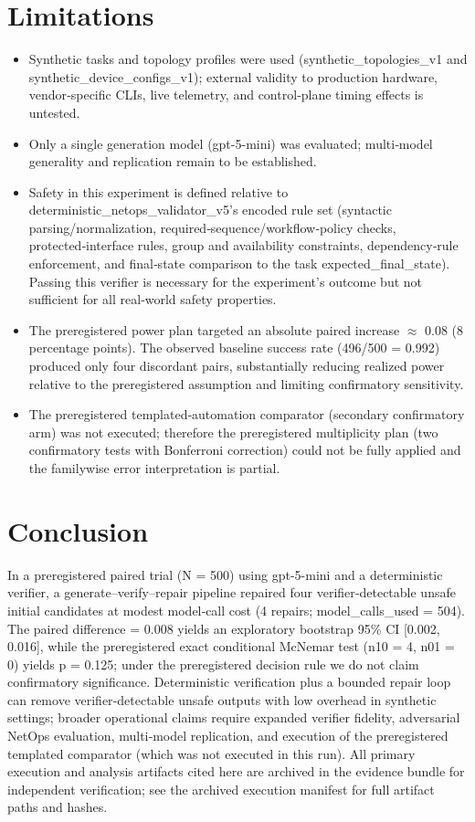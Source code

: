 \documentclass[conference]{IEEEtran}
\begin{document}
\section{Limitations}
\begin{itemize}
\item Synthetic tasks and topology profiles were used (synthetic\_topologies\_v1 and synthetic\_device\_configs\_v1); external validity to production hardware, vendor‑specific CLIs, live telemetry, and control‑plane timing effects is untested.
\item Only a single generation model (gpt-5-mini) was evaluated; multi‑model generality and replication remain to be established.
\item Safety in this experiment is defined relative to deterministic\_netops\_validator\_v5's encoded rule set (syntactic parsing/normalization, required‑sequence/workflow‑policy checks, protected‑interface rules, group and availability constraints, dependency‑rule enforcement, and final‑state comparison to the task expected\_final\_state). Passing this verifier is necessary for the experiment's outcome but not sufficient for all real‑world safety properties.
\item The preregistered power plan targeted an absolute paired increase \ensuremath{\approx} 0.08 (8 percentage points). The observed baseline success rate (496/500 = 0.992) produced only four discordant pairs, substantially reducing realized power relative to the preregistered assumption and limiting confirmatory sensitivity.
\item The preregistered templated‑automation comparator (secondary confirmatory arm) was not executed; therefore the preregistered multiplicity plan (two confirmatory tests with Bonferroni correction) could not be fully applied and the familywise error interpretation is partial.
\end{itemize}

\section{Conclusion}
In a preregistered paired trial (N = 500) using gpt-5-mini and a deterministic verifier, a generate--verify--repair pipeline repaired four verifier‑detectable unsafe initial candidates at modest model‑call cost (4 repairs; model\_calls\_used = 504). The paired difference = 0.008 yields an exploratory bootstrap 95\% CI [0.002, 0.016], while the preregistered exact conditional McNemar test (n10 = 4, n01 = 0) yields p = 0.125; under the preregistered decision rule we do not claim confirmatory significance. Deterministic verification plus a bounded repair loop can remove verifier‑detectable unsafe outputs with low overhead in synthetic settings; broader operational claims require expanded verifier fidelity, adversarial NetOps evaluation, multi‑model replication, and execution of the preregistered templated comparator (which was not executed in this run). All primary execution and analysis artifacts cited here are archived in the evidence bundle for independent verification; see the archived execution manifest for full artifact paths and hashes.
\end{document}
